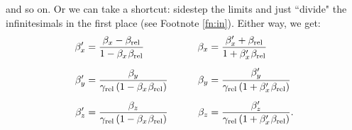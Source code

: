 \documentclass[12pt]{article}
\begin{document}
and so on. Or we can take a shortcut: sidestep the limits and just ``divide" the infinitesimals in the first place (see Footnote \ref{fn:in}). Either way, we get:
\begin{equation}\label{eq:vt}
\begin{aligned}
\beta_x^{\prime} &= \frac{\beta_x - \beta_{\textrm{rel}}}{1 - \beta_{x} \mkern1mu \beta_{\textrm{rel}}}& \qquad \beta_x &= \frac{\beta_x^{\prime} + \beta_{\textrm{rel}}}{1 + \beta_x^{\prime} \mkern1mu \beta_{\textrm{rel}}}\\[5pt]
\beta_y^{\prime} &= \frac{\beta_y}{\gamma_{\textrm{rel}} \left( 1 - \beta_{x} \mkern1mu \beta_{\textrm{rel}} \right)}& \qquad \beta_y &= \frac{\beta_y^{\prime}}{\gamma_{\textrm{rel}} \left( 1 + \beta_x^{\prime} \mkern1mu \beta_{\textrm{rel}} \right) }\\[5pt]
\beta_z^{\prime} &= \frac{\beta_z}{\gamma_{\textrm{rel}} \left( 1 - \beta_{x} \mkern1mu \beta_{\textrm{rel}} \right)}& \qquad \beta_z &= \frac{\beta_z^{\prime}}{\gamma_{\textrm{rel}} \left( 1 + \beta_x^{\prime} \mkern1mu \beta_{\textrm{rel}} \right)}.
\end{aligned}
\end{equation}
\end{document}
